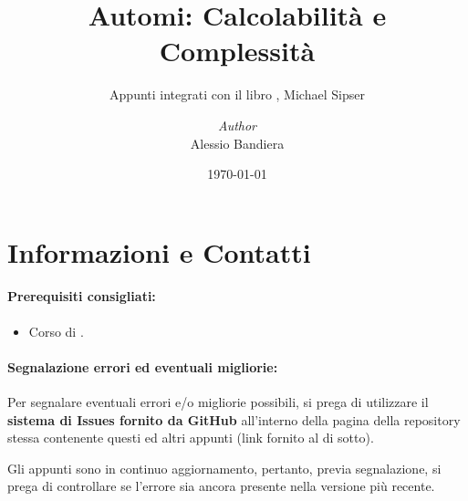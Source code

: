 \documentclass[a4paper, 12pt]{report}
\institute{\curlyquotes{\hspace{0.25mm}Sapienza} Università di Roma}
\title{Automi: Calcolabilità e Complessità}
\subtitle{Appunti integrati con il libro \curlyquotes{Introduzione alla teoria della computazione}, Michael Sipser}
\author{\textit{Author}\\Alessio Bandiera}
\date{\today}
\begin{document}
    \maketitle

    {
        \hypersetup{allcolors=black}

        \romantableofcontents
    }

    \chapter*{Informazioni e Contatti}      %
    
    \subsubsection{Prerequisiti consigliati:}
    \begin{itemize}
        \item Corso di .
    \end{itemize}

    \quad

    \subsubsection{Segnalazione errori ed eventuali migliorie:}
    
    Per segnalare eventuali errori e/o migliorie possibili, si prega di utilizzare il \textbf{sistema di Issues fornito da GitHub} all'interno della pagina della repository stessa contenente questi ed altri appunti (link fornito al di sotto).

    Gli appunti sono in continuo aggiornamento, pertanto, previa segnalazione, si prega di controllare se l'errore sia ancora presente nella versione più recente.
\end{document}
